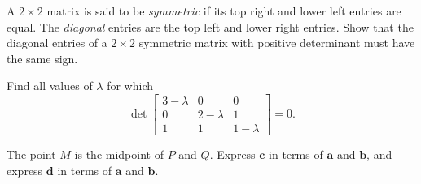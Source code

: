 \documentclass{watsonbook}
\begin{document}

\begin{aexercise}
  A $2\times 2$ matrix is said to be \textit{symmetric} if its top
  right and lower left entries are equal. The \textit{diagonal}
  entries are the top left and lower right entries. Show that the
  diagonal entries of a $2\times 2$ symmetric matrix with positive
  determinant must have the same sign.
\end{aexercise}

\begin{aexercise}
  Find all values of $\lambda$ for which 
  \[
    \det \left[
      \begin{array}{ccc}
        3 - \lambda & 0 & 0 \\
        0 & 2-\lambda & 1 \\
        1 & 1 & 1 - \lambda
      \end{array}
    \right]
    = 0. 
  \]
\end{aexercise}


\begin{aexercise}
  \begin{minipage}[t]{0.58\textwidth}
    The point $M$ is the midpoint of $P$ and $Q$. Express $\mathbf{c}$
    in terms of $\mathbf{a}$ and $\mathbf{b}$, and express $\mathbf{d}$
    in terms of $\mathbf{a}$ and $\mathbf{b}$.
  \end{minipage} \hspace{6mm}
  \begin{minipage}[t]{0.4\textwidth}
  \end{minipage}
\end{aexercise}
\end{document}

